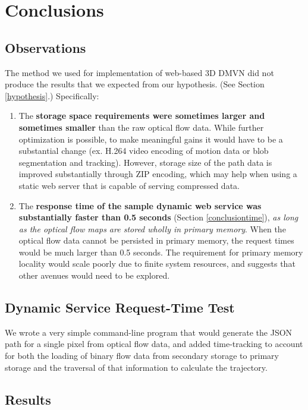 \chapter{Conclusions}

\section{Observations}
The method we used for implementation of web-based 3D DMVN did not produce the results that we expected from our hypothesis. (See Section \ref{hypothesis}.) Specifically:
\begin{enumerate}
\item The \textbf{storage space requirements were sometimes larger and sometimes smaller} than the raw optical flow data. While further optimization is possible, to make meaningful gains it would have to be a substantial change (ex. H.264 video encoding of motion data or blob segmentation and tracking). However, storage size of the path data is improved substantially through ZIP encoding, which may help when using a static web server that is capable of serving compressed data.
\item The \textbf{response time of the sample dynamic web service was substantially faster than 0.5 seconds} (Section \ref{conclusiontime}), \emph{as long as the optical flow maps are stored wholly in primary memory}. When the optical flow data cannot be persisted in primary memory, the request times would be much larger than 0.5 seconds. The requirement for primary memory locality would scale poorly due to finite system resources, and suggests that other avenues would need to be explored.
\end{enumerate}

\section{Dynamic Service Request-Time Test}
We wrote a very simple command-line program that would generate the JSON path for a single pixel from optical flow data, and added time-tracking to account for both the loading of binary flow data from secondary storage to primary storage and the traversal of that information to calculate the trajectory.

\section{Results}

